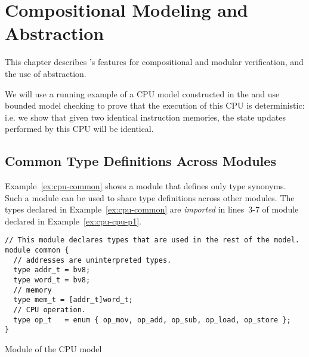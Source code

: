\chapter{Compositional Modeling and Abstraction}
\label{ch:compositional}

This chapter describes \uclid{}'s features for compositional and modular verification, and the use of abstraction.

We will use a running example of a CPU model constructed in the \uclid{} and use bounded model checking to prove that the execution of this CPU is deterministic: i.e. we show that given two identical instruction memories, the state updates performed by this CPU will be identical.

\section{Common Type Definitions Across Modules}
Example~\ref{ex:cpu-common} shows a module that defines only type synonyms. Such a module can be used to share type definitions across other modules. The types declared in Example~\ref{ex:cpu-common} are \emph{imported} in lines~3-7 of module  declared in Example~\ref{ex:cpu-cpu-p1}.

\label{sec:cpu-model}
\begin{uclidlisting}[htbp]
\begin{lstlisting}[language=uclid,style=uclidstyle]
// This module declares types that are used in the rest of the model.
module common {
  // addresses are uninterpreted types.
  type addr_t = bv8;
  type word_t = bv8;
  // memory
  type mem_t = [addr_t]word_t;
  // CPU operation.
  type op_t   = enum { op_mov, op_add, op_sub, op_load, op_store };
}
\end{lstlisting}
\caption{Module  of the CPU model}
\label{ex:cpu-common}
\end{uclidlisting}

